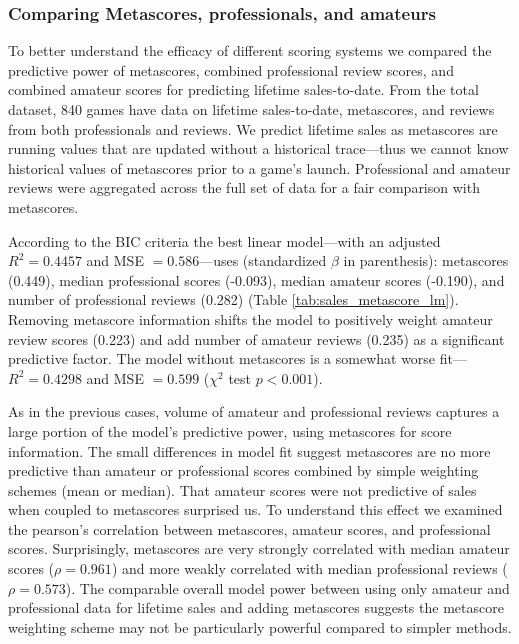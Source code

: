 \documentclass[letterpaper]{article}
\begin{document}
\subsubsection{Comparing Metascores, professionals, and amateurs}
To better understand the efficacy of different scoring systems we compared the predictive power of metascores, combined professional review scores, and combined amateur scores for predicting lifetime sales-to-date. From the total dataset, 840 games have data on lifetime sales-to-date, metascores, and reviews from both professionals and reviews. We predict lifetime sales as metascores are running values that are updated without a historical trace---thus we cannot know historical values of metascores prior to a game's launch. Professional and amateur reviews were aggregated across the full set of data for a fair comparison with metascores.

According to the BIC criteria the best linear model---with an adjusted $R^2 = 0.4457$ and MSE $= 0.586$---uses (standardized $\beta$ in parenthesis): metascores (0.449), median professional scores (-0.093), median amateur scores (-0.190), and number of professional reviews (0.282) (Table \ref{tab:sales_metascore_lm}). Removing metascore information shifts the model to positively weight amateur review scores (0.223) and add number of amateur reviews (0.235) as a significant predictive factor. The model without metascores is a somewhat worse fit---$R^2 = 0.4298$ and MSE $= 0.599$ ($\chi^2$ test $p < 0.001$).

As in the previous cases, volume of amateur and professional reviews captures a large portion of the model's predictive power, using metascores for score information. The small differences in model fit suggest metascores are no more predictive than amateur or professional scores combined by simple weighting schemes (mean or median). That amateur scores were not predictive of sales when coupled to metascores surprised us. To understand this effect we examined the pearson's correlation between metascores, amateur scores, and professional scores. Surprisingly, metascores are very strongly correlated with median amateur scores ($\rho = 0.961$) and more weakly correlated with median professional reviews ($\rho = 0.573$). The comparable overall model power between using only amateur and professional data for lifetime sales and adding metascores suggests the metascore weighting scheme may not be particularly powerful compared to simpler methods.
\end{document}
